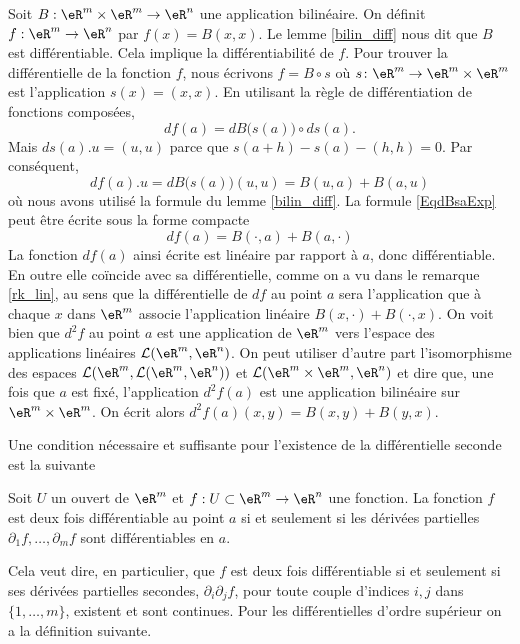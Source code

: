 \begin{example}\label{bilin_2diff}
	Soit $B:\eR^m\times \eR^m\to\eR^n$ une application bilinéaire. On définit $f:\eR^m\to\eR^n$ par $f(x)=B(x,x)$. Le lemme \ref{bilin_diff} nous dit que $B$ est différentiable. Cela implique la différentiabilité de $f$. Pour trouver la différentielle de la fonction $f$, nous écrivons $f=B\circ s$ où $s\colon \eR^m\to \eR^m\times\eR^m$ est l'application $s(x)=(x,x)$. En utilisant la règle de différentiation de fonctions composées,
	\begin{equation}
		df(a)=dB\big( s(a) \big)\circ ds(a).
	\end{equation}
	Mais $ds(a).u=(u,u)$ parce que $s(a+h)-s(a)-(h,h)=0$. Par conséquent,
	\begin{equation}		\label{EqdBsaExp}
		df(a).u=dB\big( s(a) \big)(u,u)=B(u,a)+B(a,u)
	\end{equation}
	où nous avons utilisé la formule du lemme \ref{bilin_diff}. La formule \eqref{EqdBsaExp} peut être écrite sous la forme compacte
	\begin{equation}
		df(a)=B(\cdot,a)+B(a,\cdot)
	\end{equation}
	La fonction $df(a)$ ainsi écrite est linéaire par rapport à $a$, donc différentiable. En outre elle coïncide avec sa différentielle, comme on a vu dans le remarque \ref{rk_lin}, au sens que la différentielle de $df$ au point $a$ sera l'application que à chaque $x$ dans $\eR^m$ associe l'application linéaire $B(x,\cdot)+B(\cdot, x)$. On voit bien que $d^2f$ au point $a$ est une application de $\eR^m$ vers l'espace des applications linéaires $\mathcal{L}(\eR^m, \eR^n)$. On peut utiliser d'autre part l'isomorphisme des espaces $\mathcal{L}(\eR^m,\mathcal{L}(\eR^m, \eR^n) )$ et $\mathcal{L}(\eR^m\times\eR^m, \eR^n )$ et dire que, une fois que $a$ est fixé, l'application $d^2f(a)$ est une application bilinéaire sur $\eR^m\times\eR^m$. On écrit alors $d^2f(a)(x,y)=B(x,y)+B(y,x)$.   
\end{example}

Une condition nécessaire et suffisante pour l'existence de la différentielle seconde est la suivante
\begin{proposition}
   Soit $U$ un ouvert de $\eR^m$ et  $f:U\subset\eR^m\to \eR^n$ une fonction. La fonction $f$ est deux fois différentiable au point $a$ si et seulement si les dérivées partielles $\partial_1 f, \ldots, \partial_m f $ sont différentiables en $a$. 
\end{proposition}
Cela veut dire, en particulier, que $f$ est deux fois différentiable si et seulement si ses dérivées partielles secondes, $\partial_i\partial_j f$, pour toute couple d'indices $i,j$  dans $\{1,\ldots, m\}$, existent et sont continues. Pour les différentielles d'ordre supérieur on a la définition suivante.

